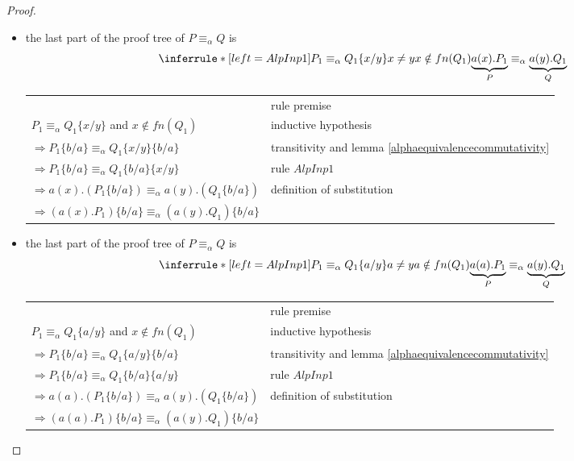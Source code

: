\begin{lemma}
\begin{proof}
\begin{description}
\begin{description}
\begin{itemize}
\begin{center}
\begin{tabular}{ll}
		  \\
		  \end{tabular}
		\end{center}	    	
	      \item 
		the last part of the proof tree of $P\equiv_{\alpha}Q$ is
		\[\inferrule*[left=AlpInp1]{
		    P_{1}\equiv_{\alpha}Q_{1}\{x/y\}
		  \\
		    x\neq y	      
		  \\
		    x\notin fn(Q_{1})
		}{
		  \underbrace{a(x).P_{1}}_{P}
		    \equiv_{\alpha}
		      \underbrace{a(y).Q_{1}}_{Q}
		}\]
		\begin{center}
		  \begin{tabular}{ll}
		      &
		    rule premise
		  \\
		    $P_{1}\equiv_{\alpha}Q_{1}\{x/y\}$ and $x\notin fn(Q_{1})$ 
		      &
		    inductive hypothesis
		  \\
		    $\Rightarrow P_{1}\{b/a\}\equiv_{\alpha}Q_{1}\{x/y\}\{b/a\}$
		      &
		    transitivity and lemma \ref{alphaequivalencecommutativity}
		  \\
		    $\Rightarrow P_{1}\{b/a\}\equiv_{\alpha}Q_{1}\{b/a\}\{x/y\}$
		      &
		    rule $AlpInp1$
		  \\
		    $\Rightarrow a(x).(P_{1}\{b/a\})\equiv_{\alpha}a(y).(Q_{1}\{b/a\})$
		      &
		    definition of substitution
		  \\
		    $\Rightarrow (a(x).P_{1})\{b/a\}\equiv_{\alpha}(a(y).Q_{1})\{b/a\}$
		      &
		    
		  \\
		  \end{tabular}
		\end{center}	    	
	      \item 
		the last part of the proof tree of $P\equiv_{\alpha}Q$ is
		\[\inferrule*[left=AlpInp1]{
		    P_{1}\equiv_{\alpha}Q_{1}\{a/y\}
		  \\
		    a\neq y	      
		  \\
		    a\notin fn(Q_{1})
		}{
		  \underbrace{a(a).P_{1}}_{P}
		    \equiv_{\alpha}
		      \underbrace{a(y).Q_{1}}_{Q}
		}\]
		\begin{center}
		  \begin{tabular}{ll}
		      &
		    rule premise
		  \\
		    $P_{1}\equiv_{\alpha}Q_{1}\{a/y\}$ and $x\notin fn(Q_{1})$ 
		      &
		    inductive hypothesis
		  \\
		    $\Rightarrow P_{1}\{b/a\}\equiv_{\alpha}Q_{1}\{a/y\}\{b/a\}$
		      &
		    transitivity and lemma \ref{alphaequivalencecommutativity}
		  \\
		    $\Rightarrow P_{1}\{b/a\}\equiv_{\alpha}Q_{1}\{b/a\}\{a/y\}$
		      &
		    rule $AlpInp1$
		  \\
		    $\Rightarrow a(a).(P_{1}\{b/a\})\equiv_{\alpha}a(y).(Q_{1}\{b/a\})$
		      &
		    definition of substitution
		  \\
		    $\Rightarrow (a(a).P_{1})\{b/a\}\equiv_{\alpha}(a(y).Q_{1})\{b/a\}$
		      &
		    

\end{tabular}
\end{center}
\end{itemize}
\end{description}
\end{description}
\end{proof}
\end{lemma}
